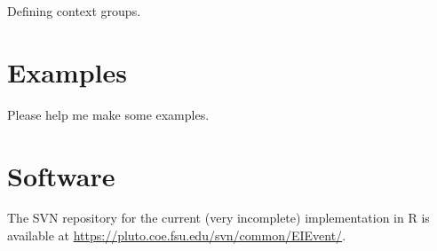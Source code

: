 \documentclass{article}
\begin{document}
  Defining context groups.

  \section{Examples}
  \label{sec:examples}

  Please help me make some examples.
  
  \section{Software}
  \label{sec:software}

  The SVN repository for the current (very incomplete) implementation
  in R is available at
  \url{https://pluto.coe.fsu.edu/svn/common/EIEvent/}.

  
  
  
\end{document}

